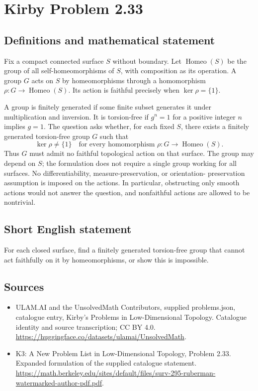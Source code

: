 \documentclass[11pt,a4paper]{article}
\begin{document}
\section*{Kirby Problem 2.33}\label{statement}

\subsection{Definitions and mathematical statement}
Fix a compact connected surface $S$ without boundary. Let
$\operatorname{Homeo}(S)$ be the group of all self-homeomorphisms of $S$,
with composition as its operation. A group $G$ acts on $S$ by homeomorphisms
through a homomorphism $\rho:G\to\operatorname{Homeo}(S)$. Its action is
faithful precisely when $\ker\rho=\{1\}$.

A group is finitely generated if some finite subset generates it under
multiplication and inversion. It is torsion-free if $g^n=1$ for a positive
integer $n$ implies $g=1$. The question asks whether, for each fixed $S$,
there exists a finitely generated torsion-free group $G$ such that
\[
 \ker\rho\ne\{1\}\quad
 \text{for every homomorphism }\rho:G\to\operatorname{Homeo}(S).
\]
Thus $G$ must admit no faithful topological action on that surface. The group
may depend on $S$; the formulation does not require a single group working
for all surfaces. No differentiability, measure-preservation, or orientation-
preservation assumption is imposed on the actions. In particular, obstructing
only smooth actions would not answer the question, and nonfaithful actions
are allowed to be nontrivial.
\subsection{Short English statement}
For each closed surface, find a finitely generated torsion-free group that cannot act faithfully on it by homeomorphisms, or show this is impossible.
\subsection{Sources}
\begin{itemize}
\item[S1] ULAM.AI and the UnsolvedMath Contributors, supplied problems.json, catalogue entry, Kirby's Problems in Low-Dimensional Topology. Catalogue identity and source transcription; CC BY 4.0.
\url{https://huggingface.co/datasets/ulamai/UnsolvedMath}.
\item[S2] K3: A New Problem List in Low-Dimensional Topology, Problem 2.33. Expanded formulation of the supplied catalogue statement.
\url{https://math.berkeley.edu/sites/default/files/surv-295-ruberman-watermarked-author-pdf.pdf}.
\end{itemize}
\end{document}
